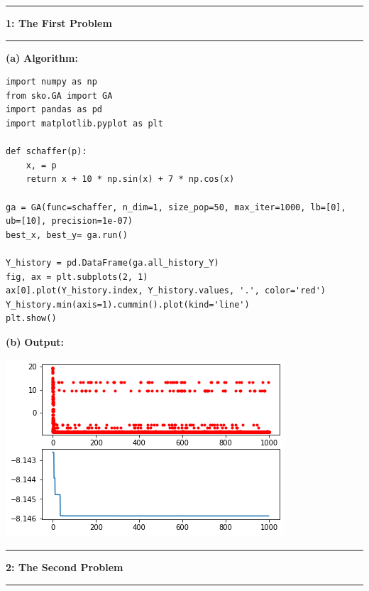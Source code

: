 \documentclass[11pt]{article}
\newcommand\question[2]{\vspace{.25in}\hrule\textbf{#1: #2}\vspace{.5em}\hrule\vspace{.10in}}
\renewcommand\part[1]{\vspace{.10in}\textbf{(#1)}}
\newcommand\algorithm{\vspace{.10in}\textbf{Algorithm: }}
\newcommand\ot{\vspace{.10in}\textbf{Output: }}
\begin{document}
\raggedright
\newcommand\NAME{Yao Xiao}  %
\newcommand\ANDREWID{2019180015}     %
\newcommand\HWNUM{8}              %


\question{1}{The First Problem} 

\part{a} \algorithm
\begin{lstlisting}
import numpy as np
from sko.GA import GA
import pandas as pd
import matplotlib.pyplot as plt

def schaffer(p):
    x, = p
    return x + 10 * np.sin(x) + 7 * np.cos(x)

ga = GA(func=schaffer, n_dim=1, size_pop=50, max_iter=1000, lb=[0], ub=[10], precision=1e-07)
best_x, best_y= ga.run()

Y_history = pd.DataFrame(ga.all_history_Y)
fig, ax = plt.subplots(2, 1)
ax[0].plot(Y_history.index, Y_history.values, '.', color='red')
Y_history.min(axis=1).cummin().plot(kind='line')
plt.show()
\end{lstlisting}

\part{b} \ot

\includegraphics{Fig1.png}


\question{2}{The Second Problem}
\end{document}
